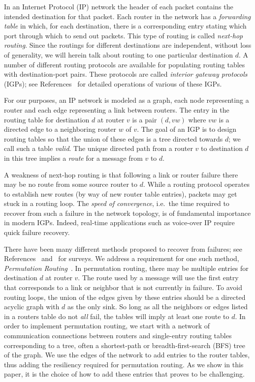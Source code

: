 \documentclass{article}
\begin{document}
In an Internet Protocol (IP) network the header of each packet
contains the intended destination for that packet.  Each router in the
network has a {\em forwarding table} in which, for each destination, there is a corresponding entry stating which port through which to send out packets.  This type of routing is called {\em next-hop routing}.
Since the routings for different destinations are independent, without
loss of generality, we will herein talk about routing to one particular
destination $d$.  A number of different routing protocols are
available for populating routing tables with  destination-port
pairs.  These protocols are called {\em interior gateway protocols}
(IGPs); see References~\cite{rfc:1058,rfc:2178,rfc:1142} for detailed operations of various of these IGPs.


For our purposes, an IP network is modeled as a graph, each node
representing a router and each edge representing a link between
routers.  The entry in the routing table for destination $d$ at router
$v$ is a pair $(d,vw)$ where $vw$ is a directed edge to a neighboring
router $w$ of $v$.  The goal of an IGP is to design routing tables so
that the union of these edges is a tree directed towards $d$; we call such a table {\em valid}.  The unique directed path from a router $v$ to destination $d$ in this tree implies a {\em route} for a message from $v$ to $d$.

A weakness of next-hop routing is that following a link or router
failure there may be no route from some source router to $d$.  While a
routing protocol operates to establish new routes (by way of new
router table entries), packets may get stuck in a routing loop.  The {\em speed of
  convergence}, i.e.~the time required to recover from such a failure in the
network topology, is of fundamental importance in modern IGPs.
Indeed, real-time applications such as voice-over IP require quick
failure recovery.  

There have been many different methods proposed to
recover from failures; see References~\cite{GSBCSHT12} and~\cite{RI07} for surveys.  
We address a requirement for one such method, {\em Permutation Routing}~\cite{VLK12}.  In permutation routing, there may be multiple entries for destination $d$ at router $v$.  The route used by a message will use the first entry that corresponds to a link or neighbor that is not currently in failure.  To avoid routing loops, the union of the edges given by these entries should be a directed acyclic graph with $d$ as the only sink.   So long as all the neighbors or edges listed in a routers table do not {\em all} fail, the tables will imply at least one route to $d$.  In order to implement permutation routing, we start with a network of communication connections between routers and single-entry routing tables corresponding to a tree, often a shortest-path or breadth-first-search (BFS) tree of the graph.  We use the edges of the network to add entries to the router tables, thus adding the resiliency required for permutation routing.  As we show in this paper, it is the choice of how to add these entries that proves to be challenging.
\end{document}
